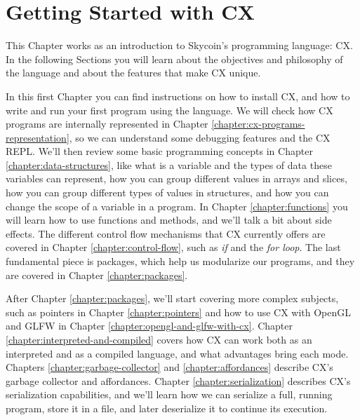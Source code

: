 \documentclass[11pt,fleqn,openany]{book} %
\begin{document}

\chapter{Getting Started with CX}
\label{chapter:getting-started-with-cx}

%

This Chapter works as an introduction to Skycoin's programming language: CX. In the following Sections you will learn about the objectives and philosophy of the language and about the features that make CX unique.

In this first Chapter you can find instructions on how to install CX, and how to write and run your first program using the language. We will check how CX programs are internally represented in Chapter \ref{chapter:cx-programs-representation}, so we can understand some debugging features and the CX REPL. We'll then review some basic programming concepts in Chapter \ref{chapter:data-structures}, like what is a variable and the types of data these variables can represent, how you can group different values in arrays and slices, how you can group different types of values in structures, and how you can change the scope of a variable in a program. In Chapter \ref{chapter:functions} you will learn how to use functions and methods, and we'll talk a bit about side effects. The different control flow mechanisms that CX currently offers are covered in Chapter \ref{chapter:control-flow}, such as \textit{if} and the \textit{for loop}. The last fundamental piece is packages, which help us modularize our programs, and they are covered in Chapter \ref{chapter:packages}.

After Chapter \ref{chapter:packages}, we'll start covering more complex subjects, such as pointers in Chapter \ref{chapter:pointers} and how to use CX with OpenGL and GLFW in Chapter \ref{chapter:opengl-and-glfw-with-cx}. Chapter \ref{chapter:interpreted-and-compiled} covers how CX can work both as an interpreted and as a compiled language, and what advantages bring each mode. Chapters \ref{chapter:garbage-collector} and \ref{chapter:affordances} describe CX's garbage collector and affordances.%
 Chapter \ref{chapter:serialization} describes CX's serialization capabilities, and we'll learn how we can serialize a full, running program, store it in a file, and later deserialize it to continue its execution.
\end{document}
